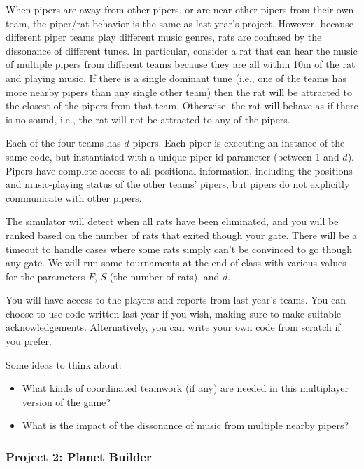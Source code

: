 When pipers are away from other pipers, or are near other pipers from
their own team, the piper/rat behavior is the same as last year's
project.  However, because different piper teams play different music
genres, rats are confused by the dissonance of different tunes.  In
particular, consider a rat that can hear the music of multiple pipers
from different teams because they are all within 10m of the rat and
playing music.  If there is a single dominant tune (i.e., one of the
teams has more nearby pipers than any single other team) then the rat
will be attracted to the closest of the pipers from that team.
Otherwise, the rat will behave as if there is no sound, i.e., the rat
will not be attracted to any of the pipers.

Each of the four teams has $d$ pipers.  Each piper is executing an
instance of the same code, but instantiated with a unique piper-id
parameter (between 1 and $d$).  Pipers have complete access to all
positional information, including the positions and music-playing status of
the other teams' pipers, but pipers do not explicitly communicate with other
pipers.

The simulator will detect when all rats have been eliminated, and you will be ranked based
on the number of rats that exited though your gate.  There will be a timeout to
handle cases where some rats simply can't be convinced
to go though any gate.  We will run some tournaments at the end of class
with various values for the parameters $F$, $S$ (the number of rats), and $d$.

You will have access to the players and reports from last year's
teams.  You can choose to use code written last year if you wish,
making sure to make suitable acknowledgements.  Alternatively, you can
write your own code from scratch if you prefer.

Some ideas to think about:
\begin{itemize}
\item What kinds of coordinated teamwork (if any) are needed in this multiplayer version of the game?
\item What is the impact of the dissonance of music from multiple nearby pipers?
\end{itemize}

\subsubsection{Project 2: Planet Builder}


